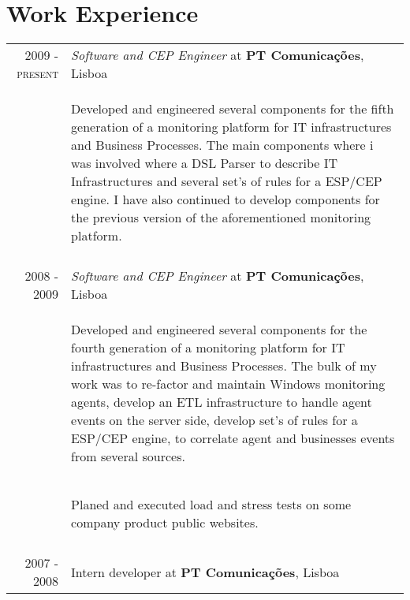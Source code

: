 \documentclass[a4paper,10pt]{article}
\begin{document}
\section{Work Experience}
\begin{tabular}{rp{11cm}}
  \textsc{2009 - present} & \emph{Software and CEP Engineer} at \textbf{PT Comunicações}, Lisboa\\ 
  & \begin{compactitem} 
     \item Developed and engineered several components for the fifth generation of a monitoring platform for IT infrastructures and Business Processes. The main components where i was involved
     where a DSL Parser to describe IT Infrastructures and several set's of rules for a ESP/CEP engine. I have also continued to develop components for the previous version of the aforementioned
     monitoring platform.
     \end{compactitem}\vspace{-1em} \\
\multicolumn{2}{c}{} \\
  \textsc{2008 - 2009} & \emph{Software and CEP Engineer} at \textbf{PT Comunicações}, Lisboa\\ 
  & \begin{compactitem} 
     \item Developed and engineered several components for the fourth generation of a monitoring platform for IT infrastructures and Business Processes.
     The bulk of my work was to re-factor and maintain Windows monitoring agents, develop an ETL infrastructure to handle agent events on the server side, develop set's of rules for a ESP/CEP 
     engine,  to correlate agent and businesses events from several sources.
     \end{compactitem}\vspace{-1em} \\
  & \begin{compactitem} 
     \item Planed and executed load and stress tests on some company product public websites.
     \end{compactitem}\vspace{-1em} \\
\multicolumn{2}{c}{} \\
  \textsc{2007 - 2008} & Intern developer at \textbf{PT Comunicações}, Lisboa\\ 

\end{tabular}
\end{document}
